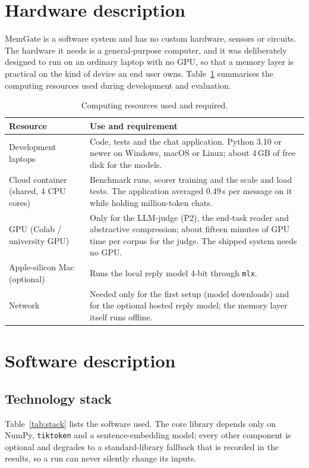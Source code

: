 \section{Hardware description}
\label{sec:hardware}

MemGate is a software system and has no custom hardware, sensors or circuits.
The hardware it needs is a general-purpose computer, and it was deliberately
designed to run on an ordinary laptop with no GPU, so that a memory layer is
practical on the kind of device an end user owns. Table~\ref{tab:hw}
summarises the computing resources used during development and evaluation.

\begin{table}[htbp]
\caption{Computing resources used and required.}
\label{tab:hw}
\centering
\fontsize{10}{12}\selectfont
\begin{tabularx}{\textwidth}{@{}p{3.6cm}X@{}}
\toprule
\textbf{Resource} & \textbf{Use and requirement} \\
\midrule
Development laptops & Code, tests and the chat application. Python 3.10 or
newer on Windows, macOS or Linux; about 4\,GB of free disk for the models. \\
Cloud container (shared, 4 CPU cores) & Benchmark runs, scorer training and
the scale and load tests. The application averaged 0.49\,s per message on it
while holding million-token chats. \\
GPU (Colab / university GPU) & Only for the LLM-judge (P2), the end-task
reader and abstractive compression; about fifteen minutes of GPU time per
corpus for the judge. The shipped system needs no GPU. \\
Apple-silicon Mac (optional) & Runs the local reply model 4-bit through
\texttt{mlx}. \\
Network & Needed only for the first setup (model downloads) and for the
optional hosted reply model; the memory layer itself runs offline. \\
\bottomrule
\end{tabularx}
\end{table}

\section{Software description}

\subsection{Technology stack}
Table~\ref{tab:stack} lists the software used. The core library depends only
on NumPy, \texttt{tiktoken} and a sentence-embedding model; every other
component is optional and degrades to a standard-library fallback that is
recorded in the results, so a run can never silently change its inputs.

